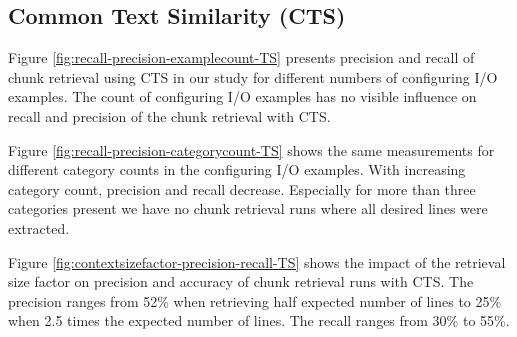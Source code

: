 \documentclass[\myrootdir/main.tex]{subfiles}
\begin{document}
\subsection{Common Text Similarity (CTS)}
Figure \ref{fig:recall-precision-examplecount-TS} presents precision and recall of chunk retrieval using CTS in our study for different numbers of configuring I/O examples.
The count of configuring I/O examples has no visible influence on recall and precision of the chunk retrieval with CTS.

Figure \ref{fig:recall-precision-categorycount-TS} shows the same measurements for different category counts in the configuring I/O examples.
With increasing category count, precision and recall decrease.
Especially for more than three categories present we have no chunk retrieval runs where all desired lines were extracted.

Figure \ref{fig:contextsizefactor-precision-recall-TS} shows the impact of the retrieval size factor on precision and accuracy of chunk retrieval runs with CTS.
The precision ranges from 52\% when retrieving half expected number of lines to 25\% when 2.5 times the expected number of lines.
The recall ranges from 30\% to 55\%.
\end{document}
